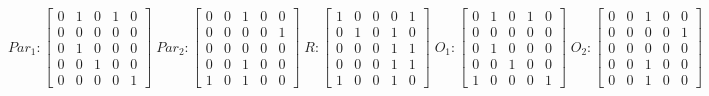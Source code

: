      $$
        Par_{1} : \begin{bmatrix}
            0 & 1 & 0 & 1 & 0 \\
            0 & 0 & 0 & 0 & 0 \\
            0 & 1 & 0 & 0 & 0 \\
			0 & 0 & 1 & 0 & 0 \\
            0 & 0 & 0 & 0 & 1 
        \end{bmatrix}
        \;
        Par_{2} : \begin{bmatrix}
            0 & 0 & 1 & 0 & 0 \\
            0 & 0 & 0 & 0 & 1 \\
            0 & 0 & 0 & 0 & 0 \\
            0 & 0 & 1 & 0 & 0 \\
            1 & 0 & 1 & 0 & 0
        \end{bmatrix}
        \;
        R : \begin{bmatrix}
            1 & 0 & 0 & 0 & 1 \\
            0 & 1 & 0 & 1 & 0 \\
            0 & 0 & 0 & 1 & 1 \\
            0 & 0 & 0 & 1 & 1 \\
            1 & 0 & 0 & 1 & 0
        \end{bmatrix}
        \;
        O_{1} : \begin{bmatrix}
            0 & 1 & 0 & 1 & 0 \\
            0 & 0 & 0 & 0 & 0 \\
            0 & 1 & 0 & 0 & 0 \\
            0 & 0 & 1 & 0 & 0 \\
            1 & 0 & 0 & 0 & 1
        \end{bmatrix}
        \;
        O_{2} : \begin{bmatrix}
            0 & 0 & 1 & 0 & 0 \\
            0 & 0 & 0 & 0 & 1 \\
            0 & 0 & 0 & 0 & 0 \\
            0 & 0 & 1 & 0 & 0 \\
            0 & 0 & 1 & 0 & 0
        \end{bmatrix}
    $$ 
